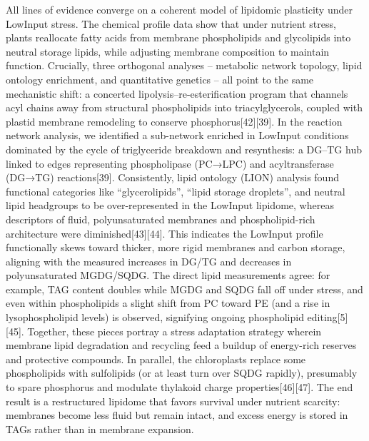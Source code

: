 \documentclass[10pt,letterpaper]{article}
\begin{document}
\begin{itemize}
All lines of evidence converge on a coherent model of lipidomic plasticity under LowInput stress. The chemical profile data show that under nutrient stress, plants reallocate fatty acids from membrane phospholipids and glycolipids into neutral storage lipids, while adjusting membrane composition to maintain function. Crucially, three orthogonal analyses – metabolic network topology, lipid ontology enrichment, and quantitative genetics – all point to the same mechanistic shift: a concerted lipolysis–re-esterification program that channels acyl chains away from structural phospholipids into triacylglycerols, coupled with plastid membrane remodeling to conserve phosphorus[42][39]. In the reaction network analysis, we identified a sub-network enriched in LowInput conditions dominated by the cycle of triglyceride breakdown and resynthesis: a DG–TG hub linked to edges representing phospholipase (PC→LPC) and acyltransferase (DG→TG) reactions[39]. Consistently, lipid ontology (LION) analysis found functional categories like “glycerolipids”, “lipid storage droplets”, and neutral lipid headgroups to be over-represented in the LowInput lipidome, whereas descriptors of fluid, polyunsaturated membranes and phospholipid-rich architecture were diminished[43][44]. This indicates the LowInput profile functionally skews toward thicker, more rigid membranes and carbon storage, aligning with the measured increases in DG/TG and decreases in polyunsaturated MGDG/SQDG. The direct lipid measurements agree: for example, TAG content doubles while MGDG and SQDG fall off under stress, and even within phospholipids a slight shift from PC toward PE (and a rise in lysophospholipid levels) is observed, signifying ongoing phospholipid editing[5][45]. Together, these pieces portray a stress adaptation strategy wherein membrane lipid degradation and recycling feed a buildup of energy-rich reserves and protective compounds. In parallel, the chloroplasts replace some phospholipids with sulfolipids (or at least turn over SQDG rapidly), presumably to spare phosphorus and modulate thylakoid charge properties[46][47]. The end result is a restructured lipidome that favors survival under nutrient scarcity: membranes become less fluid but remain intact, and excess energy is stored in TAGs rather than in membrane expansion.

\end{itemize}
\end{document}
